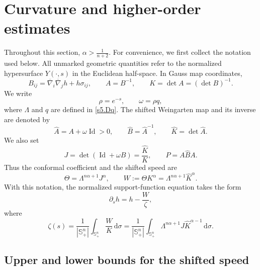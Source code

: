 \documentclass[11pt, reqno]{amsart}
\theoremstyle{remark}
\theoremstyle{definition}
\numberwithin{equation}{section}
\newcommand{\Id}{\operatorname{Id}}
\begin{document}
\section{Curvature and higher-order estimates}
\label{sec:apriori-alpha}

Throughout this section, $\alpha>\frac{1}{n+2}$. For
convenience, we first collect the notation used below. All
unmarked geometric quantities refer to the normalized
hypersurface $Y(\cdot,s)$ in the Euclidean half-space. In Gauss
map coordinates,
\begin{equation*}
    B_{ij}
    =
    \overline{\nabla}_i\overline{\nabla}_j h
    +h\sigma_{ij},
    \qquad
    A=B^{-1},
    \qquad
    K=\det A=(\det B)^{-1}.
\end{equation*}
We write
\begin{equation*}
    \rho=e^{-s},
    \qquad
    \omega=\rho q,
\end{equation*}
where $\Lambda$ and $q$ are defined in \eqref{s5.Dq}.
The shifted Weingarten map and its inverse are denoted by
\begin{equation*}
    \widehat A=A+\omega\Id>0,
    \qquad
    \widehat B=\widehat A^{-1},
    \qquad
    \widehat K=\det\widehat A.
\end{equation*}
We also set
\begin{equation*}
    J=\det(\Id+\omega B)
      =\frac{\widehat K}{K},
    \qquad
    P=A\widehat B A.
\end{equation*}
Thus the conformal coefficient and the shifted speed are
\begin{equation*}
    \Theta=\Lambda^{n\alpha+1}J^\alpha,
    \qquad
    W:=\Theta K^\alpha
      =\Lambda^{n\alpha+1}\widehat K^\alpha.
\end{equation*}
With this notation, the normalized support-function equation
takes the form
\begin{equation}\label{eq:F-shifted}
    \partial_s h=h-\frac{W}{\zeta},
\end{equation}
where
\begin{equation*}
    \zeta(s)
    =
    \frac{1}{|\mathbb S^n_+|}
    \int_{\mathbb S^n_+}\frac{W}{K}\,\mathrm{d}\sigma
    =
    \frac{1}{|\mathbb S^n_+|}
    \int_{\mathbb S^n_+}
    \Lambda^{n\alpha+1}
    J\widehat K^{\alpha-1}\,\mathrm{d}\sigma.
\end{equation*}


\subsection{Upper and lower bounds for the shifted speed}
\end{document}

